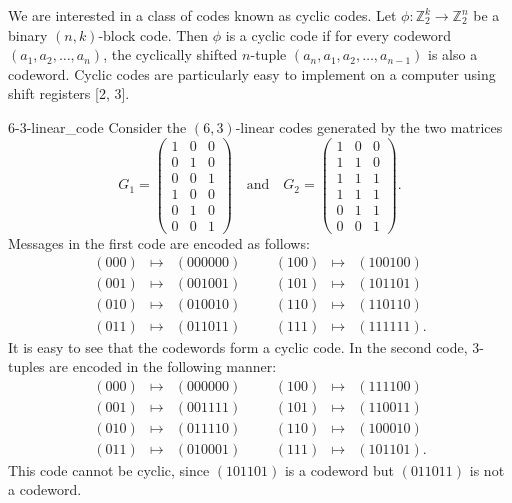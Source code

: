 We are interested in a class of codes known as cyclic codes.  Let $\phi : {\mathbb Z}_2^k \rightarrow {\mathbb  Z}_2^n$ be a binary $(n,k)$-block code.  Then $\phi$ is a {\bfi cyclic code\/} if for every codeword $(a_1, a_2, \ldots, a_n )$, the cyclically shifted $n$-tuple $(a_n, a_1, a_2, \ldots, a_{n-1} )$ is also a codeword.  Cyclic codes are particularly easy to implement on a  computer using shift registers [2, 3].  


\begin{example}{6-3-linear_code}
Consider the $(6,3)$-linear codes generated by the two matrices
\[
G_1 
= 
\begin{pmatrix}
1 & 0 & 0 \\
0 & 1 & 0 \\
0 & 0 & 1 \\
1 & 0 & 0 \\
0 & 1 & 0 \\
0 & 0 & 1 
\end{pmatrix}
\quad
\text{and}
\quad
G_2 = 
\begin{pmatrix}
1 & 0 & 0 \\
1 & 1 & 0 \\
1 & 1 & 1 \\
1 & 1 & 1 \\
0 & 1 & 1 \\
0 & 0 & 1
\end{pmatrix}.
\]
Messages in the first code are encoded as follows:
\[
\begin{array}{rclccrcl}
(000) & \mapsto & (000000) & & & (100) & \mapsto & (100100) \\
(001) & \mapsto & (001001) & & & (101) & \mapsto & (101101) \\
(010) & \mapsto & (010010) & & & (110) & \mapsto & (110110) \\
(011) & \mapsto & (011011) & & & (111) & \mapsto & (111111).
\end{array}
\]
It is easy to see that the codewords form a cyclic code.  In the second code, 3-tuples are encoded in the following manner:
\[
\begin{array}{rclccrcl}
(000) & \mapsto & (000000) & & & (100) & \mapsto & (111100) \\
(001) & \mapsto & (001111) & & & (101) & \mapsto & (110011) \\
(010) & \mapsto & (011110) & & & (110) & \mapsto & (100010) \\
(011) & \mapsto & (010001) & & & (111) & \mapsto & (101101).
\end{array}
\]
This code cannot be cyclic, since $(101101)$ is a codeword but $(011011)$ is not a codeword.
\end{example}


